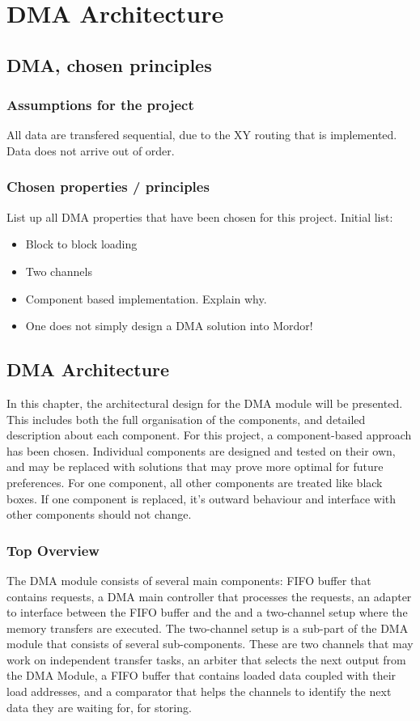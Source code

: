 \chapter{DMA Architecture}

\section{DMA, chosen principles}

\subsection{Assumptions for the project}
All data are transfered sequential, due to the  XY routing that is implemented.
Data does not arrive out of order.

\subsection{Chosen properties / principles}

List up all DMA properties that have been chosen for this project.
Initial list:
\begin{itemize}
    \item Block to block loading
    \item Two channels
    \item Component based implementation. Explain why.
    \item One does not simply design a DMA solution into Mordor!
\end{itemize}

\section{DMA Architecture}
In this chapter, the architectural design for the DMA module will be presented.
This includes both the full organisation of the components, and detailed description about each component. 
For this project, a component-based approach has been chosen.
Individual components are designed and tested on their own, and may be replaced with solutions that may prove more optimal for future preferences.
For one component, all other components are treated like black boxes.
If one component is replaced, it's outward behaviour and interface with other components should not change.

\subsection{Top Overview}
The DMA module consists of several main components: FIFO buffer that contains requests, a DMA main controller that processes the requests, an adapter to interface between the FIFO buffer and the and a two-channel setup where the memory transfers are executed. 
The two-channel setup is a sub-part of the DMA module that consists of several sub-components.
These are two channels that may work on independent transfer tasks, an arbiter that selects the next output from the DMA Module, a FIFO buffer that contains loaded data coupled with their load addresses, and a comparator that helps the channels to identify the next data they are waiting for, for storing.

